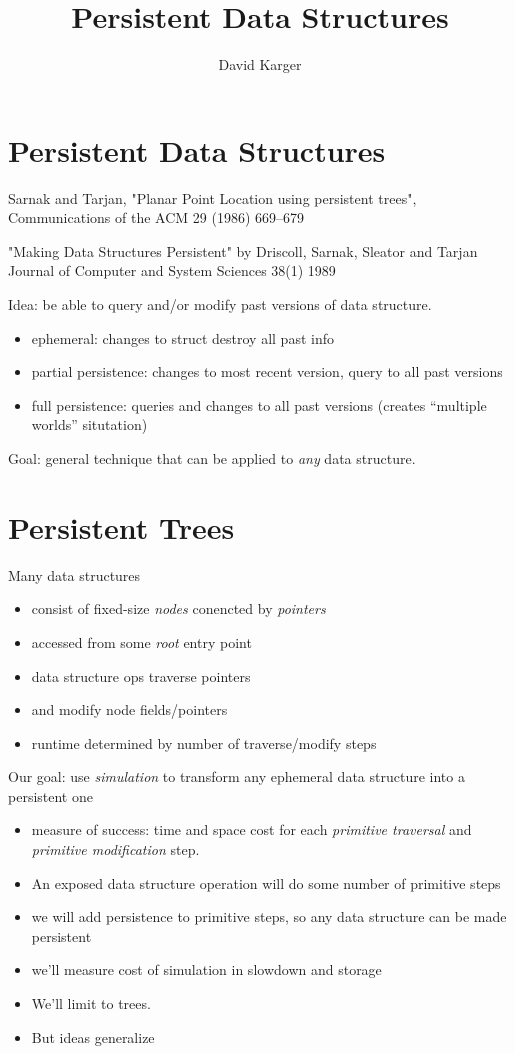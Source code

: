 \documentclass{article}
\title{Persistent Data Structures}
\author{David Karger}
\begin{document}

\section{Persistent Data Structures}


Sarnak and Tarjan, "Planar Point Location using persistent trees",
Communications of the ACM 29 (1986) 669--679

"Making Data Structures Persistent" by Driscoll, Sarnak, Sleator and Tarjan 
Journal of Computer and System Sciences 38(1) 1989

Idea: be able to query and/or modify past versions of data structure.
\begin{itemize}
\item ephemeral: changes to struct destroy all past info
\item partial persistence: changes to most recent version, query to
  all past versions
\item full persistence: queries and changes to all past versions
  (creates ``multiple worlds'' situtation)
\end{itemize}

Goal: general technique that can be applied to \emph{any} data
structure.



\section{Persistent Trees}

Many data structures
\begin{itemize}
\item consist of fixed-size \emph{nodes}
  conencted by \emph{pointers}
\item accessed from some \emph{root} entry point
\item data structure ops traverse pointers
\item and modify node fields/pointers
\item runtime determined by number of traverse/modify steps
\end{itemize}

Our goal: use \emph{simulation} to transform any ephemeral data
structure into a persistent one
\begin{itemize}
\item measure of success: time and space cost for each \emph{primitive
    traversal} and \emph{primitive modification} step.
\item An exposed data structure operation will do some number of
  primitive steps
\item we will add persistence to primitive steps, so any data
  structure can be made persistent
\item we'll measure cost of simulation in slowdown and storage
\item We'll limit to trees.
\item But ideas generalize
\end{itemize}
\end{document}

